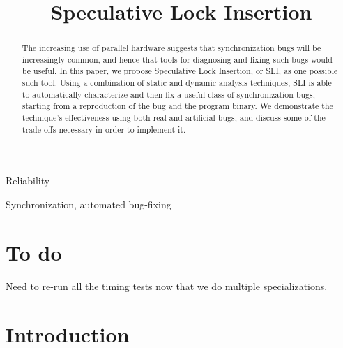 \documentclass[10pt,twocolumn,preprint,natbib,authoryear]{sigplanconf}
\begin{document}
\copyrightdata{[to be supplied]} 


\title{Speculative Lock Insertion}

\authorinfo{}{}{}

\maketitle

\begin{abstract}

The increasing use of parallel hardware suggests that synchronization
bugs will be increasingly common, and hence that tools for diagnosing
and fixing such bugs would be useful.  In this paper, we propose
Speculative Lock Insertion, or SLI, as one possible such tool.  Using
a combination of static and dynamic analysis techniques, SLI is able
to automatically characterize and then fix a useful class of
synchronization bugs, starting from a reproduction of the bug and the
program binary.  We demonstrate the technique's effectiveness using
both real and artificial bugs, and discuss some of the trade-offs
necessary in order to implement it.

\end{abstract}


\terms
Reliability

\keywords
Synchronization, automated bug-fixing

\section{To do}

Need to re-run all the timing tests now that we do multiple
specializations.

\section{Introduction}
\end{document}
